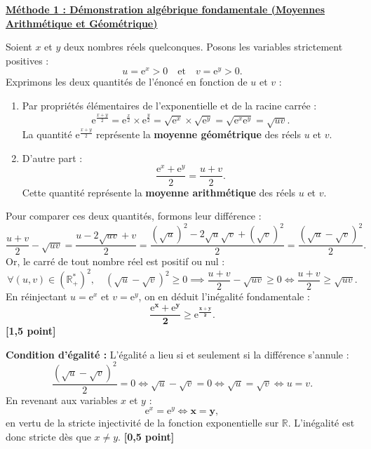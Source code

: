 \documentclass[11pt,a4paper]{article}
\newcommand{\R}{\mathbb{R}}
\newcommand{\e}{\mathrm{e}}
\begin{document}
\begin{correctionbox}
\underline{\textbf{Méthode 1 : Démonstration algébrique fondamentale (Moyennes Arithmétique et Géométrique)}}

Soient $x$ et $y$ deux nombres réels quelconques.
Posons les variables strictement positives :
\[
u = \e^x > 0 \quad \text{et} \quad v = \e^y > 0.
\]
Exprimons les deux quantités de l'énoncé en fonction de $u$ et $v$ :
\begin{enumerate}
    \item Par propriétés élémentaires de l'exponentielle et de la racine carrée :
    \[
    \e^{\frac{x+y}{2}} = \e^{\frac{x}{2}} \times \e^{\frac{y}{2}} = \sqrt{\e^x} \times \sqrt{\e^y} = \sqrt{\e^x \e^y} = \sqrt{uv}.
    \]
    La quantité $\e^{\frac{x+y}{2}}$ représente la \textbf{moyenne géométrique} des réels $u$ et $v$.
    \item D'autre part :
    \[
    \frac{\e^x + \e^y}{2} = \frac{u+v}{2}.
    \]
    Cette quantité représente la \textbf{moyenne arithmétique} des réels $u$ et $v$.
\end{enumerate}

Pour comparer ces deux quantités, formons leur différence :
\[
\frac{u + v}{2} - \sqrt{uv} = \frac{u - 2\sqrt{uv} + v}{2} = \frac{(\sqrt{u})^2 - 2\sqrt{u}\sqrt{v} + (\sqrt{v})^2}{2} = \frac{(\sqrt{u} - \sqrt{v})^2}{2}.
\]
Or, le carré de tout nombre réel est positif ou nul :
\[
\forall (u, v) \in (\R_+^*)^2, \quad (\sqrt{u} - \sqrt{v})^2 \ge 0 \implies \frac{u+v}{2} - \sqrt{uv} \ge 0 \iff \frac{u+v}{2} \ge \sqrt{uv}.
\]
En réinjectant $u = \e^x$ et $v = \e^y$, on en déduit l'inégalité fondamentale :
\[
\mathbf{\frac{\e^x + \e^y}{2} \ge \e^{\frac{x+y}{2}}}.
\] \hfill \textbf{[1{,}5 point]}

\medskip
\textbf{Condition d'égalité :}
L'égalité a lieu si et seulement si la différence s'annule :
\[
\frac{(\sqrt{u} - \sqrt{v})^2}{2} = 0 \iff \sqrt{u} - \sqrt{v} = 0 \iff \sqrt{u} = \sqrt{v} \iff u = v.
\]
En revenant aux variables $x$ et $y$ :
\[
\e^x = \e^y \iff \mathbf{x = y},
\]
en vertu de la stricte injectivité de la fonction exponentielle sur $\R$.
L'inégalité est donc stricte dès que $x \neq y$. \hfill \textbf{[0{,}5 point]}
\end{correctionbox}
\end{document}
